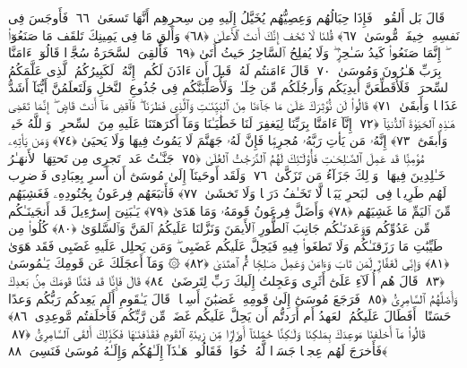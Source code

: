  قَالَ بَل أَلقُوا۟ ۖ فَإِذَا حِبَالُهُم وَعِصِيُّهُم يُخَيَّلُ إِلَيهِ مِن سِحرِهِم أَنَّهَا تَسعَىٰ ﴿٦٦﴾
 فَأَوجَسَ فِى نَفسِهِۦ خِيفَةًۭ مُّوسَىٰ ﴿٦٧﴾
 قُلنَا لَا تَخَف إِنَّكَ أَنتَ ٱلأَعلَىٰ ﴿٦٨﴾
 وَأَلقِ مَا فِى يَمِينِكَ تَلقَف مَا صَنَعُوٓا۟ ۖ إِنَّمَا صَنَعُوا۟ كَيدُ سَـٰحِرٍۢ ۖ وَلَا يُفلِحُ ٱلسَّاحِرُ حَيثُ أَتَىٰ ﴿٦٩﴾
 فَأُلقِىَ ٱلسَّحَرَةُ سُجَّدًۭا قَالُوٓا۟ ءَامَنَّا بِرَبِّ هَـٰرُونَ وَمُوسَىٰ ﴿٧٠﴾
 قَالَ ءَامَنتُم لَهُۥ قَبلَ أَن ءَاذَنَ لَكُم ۖ إِنَّهُۥ لَكَبِيرُكُمُ ٱلَّذِى عَلَّمَكُمُ ٱلسِّحرَ ۖ فَلَأُقَطِّعَنَّ أَيدِيَكُم وَأَرجُلَكُم مِّن خِلَـٰفٍۢ وَلَأُصَلِّبَنَّكُم فِى جُذُوعِ ٱلنَّخلِ وَلَتَعلَمُنَّ أَيُّنَآ أَشَدُّ عَذَابًۭا وَأَبقَىٰ ﴿٧١﴾
 قَالُوا۟ لَن نُّؤثِرَكَ عَلَىٰ مَا جَآءَنَا مِنَ ٱلبَيِّنَـٰتِ وَٱلَّذِى فَطَرَنَا ۖ فَٱقضِ مَآ أَنتَ قَاضٍ ۖ إِنَّمَا تَقضِى هَـٰذِهِ ٱلحَيَوٰةَ ٱلدُّنيَآ ﴿٧٢﴾
 إِنَّآ ءَامَنَّا بِرَبِّنَا لِيَغفِرَ لَنَا خَطَٰيَـٰنَا وَمَآ أَكرَهتَنَا عَلَيهِ مِنَ ٱلسِّحرِ ۗ وَٱللَّهُ خَيرٌۭ وَأَبقَىٰٓ ﴿٧٣﴾
 إِنَّهُۥ مَن يَأتِ رَبَّهُۥ مُجرِمًۭا فَإِنَّ لَهُۥ جَهَنَّمَ لَا يَمُوتُ فِيهَا وَلَا يَحيَىٰ ﴿٧٤﴾
 وَمَن يَأتِهِۦ مُؤمِنًۭا قَد عَمِلَ ٱلصَّـٰلِحَـٰتِ فَأُو۟لَـٰٓئِكَ لَهُمُ ٱلدَّرَجَٰتُ ٱلعُلَىٰ ﴿٧٥﴾
 جَنَّـٰتُ عَدنٍۢ تَجرِى مِن تَحتِهَا ٱلأَنهَـٰرُ خَـٰلِدِينَ فِيهَا ۚ وَذَٟلِكَ جَزَآءُ مَن تَزَكَّىٰ ﴿٧٦﴾
 وَلَقَد أَوحَينَآ إِلَىٰ مُوسَىٰٓ أَن أَسرِ بِعِبَادِى فَٱضرِب لَهُم طَرِيقًۭا فِى ٱلبَحرِ يَبَسًۭا لَّا تَخَـٰفُ دَرَكًۭا وَلَا تَخشَىٰ ﴿٧٧﴾
 فَأَتبَعَهُم فِرعَونُ بِجُنُودِهِۦ فَغَشِيَهُم مِّنَ ٱليَمِّ مَا غَشِيَهُم ﴿٧٨﴾
 وَأَضَلَّ فِرعَونُ قَومَهُۥ وَمَا هَدَىٰ ﴿٧٩﴾
 يَـٰبَنِىٓ إِسرَٰٓءِيلَ قَد أَنجَينَـٰكُم مِّن عَدُوِّكُم وَوَٟعَدنَـٰكُم جَانِبَ ٱلطُّورِ ٱلأَيمَنَ وَنَزَّلنَا عَلَيكُمُ ٱلمَنَّ وَٱلسَّلوَىٰ ﴿٨٠﴾
 كُلُوا۟ مِن طَيِّبَٰتِ مَا رَزَقنَـٰكُم وَلَا تَطغَوا۟ فِيهِ فَيَحِلَّ عَلَيكُم غَضَبِى ۖ وَمَن يَحلِل عَلَيهِ غَضَبِى فَقَد هَوَىٰ ﴿٨١﴾
 وَإِنِّى لَغَفَّارٌۭ لِّمَن تَابَ وَءَامَنَ وَعَمِلَ صَـٰلِحًۭا ثُمَّ ٱهتَدَىٰ ﴿٨٢﴾
 ۞ وَمَآ أَعجَلَكَ عَن قَومِكَ يَـٰمُوسَىٰ ﴿٨٣﴾
 قَالَ هُم أُو۟لَآءِ عَلَىٰٓ أَثَرِى وَعَجِلتُ إِلَيكَ رَبِّ لِتَرضَىٰ ﴿٨٤﴾
 قَالَ فَإِنَّا قَد فَتَنَّا قَومَكَ مِنۢ بَعدِكَ وَأَضَلَّهُمُ ٱلسَّامِرِىُّ ﴿٨٥﴾
 فَرَجَعَ مُوسَىٰٓ إِلَىٰ قَومِهِۦ غَضبَٰنَ أَسِفًۭا ۚ قَالَ يَـٰقَومِ أَلَم يَعِدكُم رَبُّكُم وَعدًا حَسَنًا ۚ أَفَطَالَ عَلَيكُمُ ٱلعَهدُ أَم أَرَدتُّم أَن يَحِلَّ عَلَيكُم غَضَبٌۭ مِّن رَّبِّكُم فَأَخلَفتُم مَّوعِدِى ﴿٨٦﴾
 قَالُوا۟ مَآ أَخلَفنَا مَوعِدَكَ بِمَلكِنَا وَلَـٰكِنَّا حُمِّلنَآ أَوزَارًۭا مِّن زِينَةِ ٱلقَومِ فَقَذَفنَـٰهَا فَكَذَٟلِكَ أَلقَى ٱلسَّامِرِىُّ ﴿٨٧﴾
 فَأَخرَجَ لَهُم عِجلًۭا جَسَدًۭا لَّهُۥ خُوَارٌۭ فَقَالُوا۟ هَـٰذَآ إِلَـٰهُكُم وَإِلَـٰهُ مُوسَىٰ فَنَسِىَ ﴿٨٨﴾
